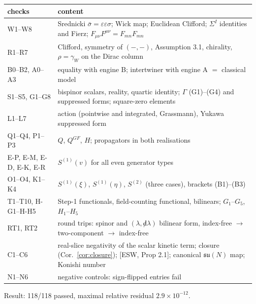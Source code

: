 \documentclass[11pt]{article}
\theoremstyle{definition}
\begin{document}
\begin{center}\small
\begin{tabular}{l|p{12.5cm}}
checks & content \\
\hline
W1--W8 & Srednicki $\bar\sigma=\varepsilon\varepsilon\sigma$; Wick map; Euclidean Clifford; $\Sigma^I$ identities and Fierz; $F_{\mu\nu}F^{\mu\nu}=F_{mn}F_{mn}$ \\
R1--R7 & Clifford, symmetry of $(-,-)$, Assumption 3.1, chirality, $\rho=\gamma_W$ on the Dirac column \\
B0--B2, A0--A3 & equality with engine B; intertwiner with engine A $=$ classical model \\
S1--S5, G1--G8 & bispinor scalars, reality, quartic identity; $\Gamma$ (G1)--(G4) and suppressed forms; square-zero elements \\
L1--L7 & action (pointwise and integrated, Grassmann), Yukawa suppressed form \\
Q1--Q4, P1--P3 & $Q$, $Q^{GF}$, $H$; propagators in both realisations \\
E-P, E-M, E-D, E-K, E-R & $S^{(1)}(v)$ for all even generator types \\
O1--O4, K1--K4 & $S^{(1)}(\xi)$, $S^{(1)}(\eta)$, $S^{(2)}$ (three cases), brackets (B1)--(B3) \\
T1--T10, H-G1--H-H5 & Step-1 functionals, field-counting functional, bilinears; $G_1$--$G_5$, $H_1$--$H_5$ \\
RT1, RT2 & round trips: spinor and $(\lambda,{\not d}\lambda)$ bilinear form, index-free $\to$ two-component $\to$ index-free \\
C1--C6 & real-slice negativity of the scalar kinetic term; closure (Cor.~\ref{cor:closure}); [ESW, Prop 2.1]; canonical $\mathfrak{su}(N)$ map; Konishi number \\
N1--N6 & negative controls: sign-flipped entries fail \\
\end{tabular}
\end{center}

Result: 118/118 passed, maximal relative residual $2.9\times10^{-12}$.
\end{document}
